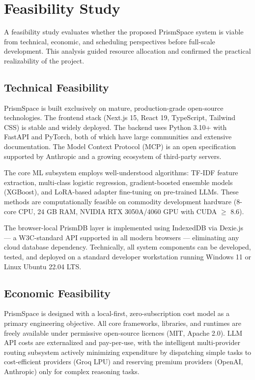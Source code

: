 \documentclass[12pt,a4paper]{report}
\begin{document}
\chapter{Feasibility Study}
A feasibility study evaluates whether the proposed PrismSpace system is viable from technical, economic, and scheduling perspectives before full-scale development. This analysis guided resource allocation and confirmed the practical realizability of the project.

\section{Technical Feasibility}
PrismSpace is built exclusively on mature, production-grade open-source technologies. The frontend stack (Next.js 15, React 19, TypeScript, Tailwind CSS) is stable and widely deployed. The backend uses Python 3.10+ with FastAPI and PyTorch, both of which have large communities and extensive documentation. The Model Context Protocol (MCP) is an open specification supported by Anthropic and a growing ecosystem of third-party servers.

The core ML subsystem employs well-understood algorithms: TF-IDF feature extraction, multi-class logistic regression, gradient-boosted ensemble models (XGBoost), and LoRA-based adapter fine-tuning on pre-trained LLMs. These methods are computationally feasible on commodity development hardware (8-core CPU, 24 GB RAM, NVIDIA RTX 3050A/4060 GPU with CUDA $\ge$ 8.6).

The browser-local PrismDB layer is implemented using IndexedDB via Dexie.js — a W3C-standard API supported in all modern browsers — eliminating any cloud database dependency. Technically, all system components can be developed, tested, and deployed on a standard developer workstation running Windows 11 or Linux Ubuntu 22.04 LTS.

\section{Economic Feasibility}
PrismSpace is designed with a local-first, zero-subscription cost model as a primary engineering objective. All core frameworks, libraries, and runtimes are freely available under permissive open-source licences (MIT, Apache 2.0). LLM API costs are externalized and pay-per-use, with the intelligent multi-provider routing subsystem actively minimizing expenditure by dispatching simple tasks to cost-efficient providers (Groq LPU) and reserving premium providers (OpenAI, Anthropic) only for complex reasoning tasks.
\end{document}
